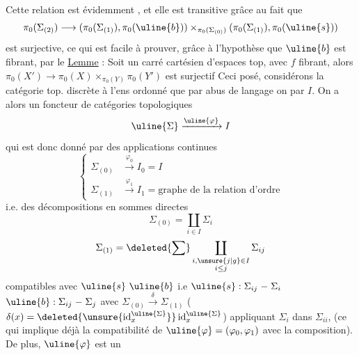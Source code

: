  Cette relation est évidemment , et
elle est transitive grâce au fait que
\[
\pi_0(\Sigma_{(2)})\longrightarrow
(\pi_0(\Sigma_{(1)}),\pi_0(\uline{b}))\times_{\pi_0(\Sigma_{(0)})}
(\pi_0(\Sigma_{(1)}),\pi_0(\uline{s}))
\]
est surjective, ce qui est facile à prouver,
grâce à l'hypothèse que $\uline{b}$ est fibrant, par le
\uline{Lemme} : Soit
un carré
cartésien d'espaces top, avec $f$ fibrant,
alors $\pi_0(X')\longrightarrow\pi_0(X)\times_{\pi_0(Y)}\pi_0(Y')$ est surjectif
Ceci posé, considérons la catégorie top. discrète 
à l'ens ordonné  que par abus de langage
on  par $I$. On a alors un foncteur
 de catégories topologiques 
\[
\uline{\Sigma}\xrightarrow{\uline{\varphi}}I
\]
qui est donc donné par des applications continues
\[
\left\{\begin{aligned}
\Sigma_{(0)}&\xrightarrow{\varphi_0}I_0=I\\
\Sigma_{(1)}&\xrightarrow{\varphi_1}I_1=\text{graphe de la relation d'ordre}
\end{aligned}\right.
\]
i.e. des décompositions en sommes directes
\[
\Sigma_{(0)}=\coprod_{i\in I}\Sigma_i
\]
\[
\Sigma_{(1)}=\deleted{\sum}\coprod_{\substack{i,\unsure{j|g}\in I\\i\leq j}}\Sigma_{ij}
\]
compatibles avec $\uline{s}\ \uline{b}$
i.e $\uline{s}:\Sigma_{ij}\mathrel{-}\Sigma_i$
$\uline{b}:\Sigma_{ij}\mathrel{-}\Sigma_j$
avec $\Sigma_{(0)}\xrightarrow{\delta}\Sigma_{(1)}$ ($\delta(x)=\deleted{\unsure{\operatorname{id}^{\uline{\Sigma}}_x}}\operatorname{id}^{\uline{\Sigma}}_x$)
appliquant $\Sigma_i$ dans $\Sigma_{ii}$,  (ce qui
implique déjà la compatibilité de $\uline{\varphi}=(\varphi_0,\varphi_1)$ avec
la composition). De plus, $\uline{\varphi}$ est un
